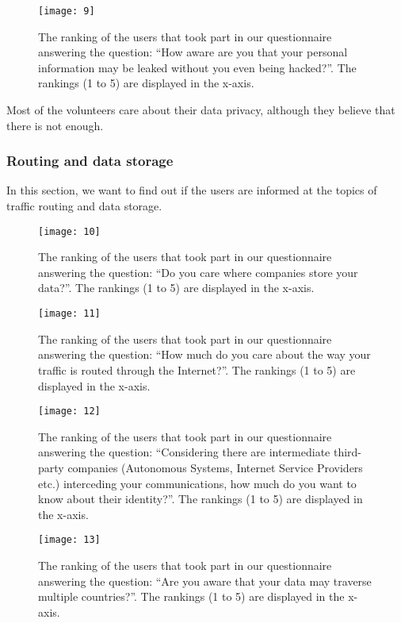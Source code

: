 \begin{figure}[H]
\centering
\texttt{[image: 9]}
\caption{The ranking of the users that took part in our questionnaire answering
the question: ``How aware are you that your personal information may be leaked 
without you even being hacked?''. The rankings (1 to 5) are displayed in the 
x-axis.}
\end{figure}

Most of the volunteers care about their data privacy, although they believe that 
there is not enough.

\subsubsection{Routing and data storage}

In this section, we want to find out if the users are informed at the topics of 
traffic routing and  data storage.

\begin{figure}[H]
\centering
\texttt{[image: 10]}
\caption{The ranking of the users that took part in our questionnaire answering
the question: ``Do you care where companies store your data?''. The rankings (1 
to 5) are displayed in the x-axis.}
\end{figure}

\begin{figure}[H]
\centering
\texttt{[image: 11]}
\caption{The ranking of the users that took part in our questionnaire answering
the question: ``How much do you care about the way your traffic is routed 
through the Internet?''. The rankings (1 to 5) are displayed in the x-axis.}
\end{figure}

\begin{figure}[H]
\centering
\texttt{[image: 12]}
\caption{The ranking of the users that took part in our questionnaire answering
the question: ``Considering there are intermediate third-party companies 
(Autonomous Systems, Internet Service Providers etc.) interceding your 
communications, how much do you want to know about their identity?''. The 
rankings (1 to 5) are displayed in the x-axis.}
\end{figure}

\begin{figure}[H]
\centering
\texttt{[image: 13]}
\caption{The ranking of the users that took part in our questionnaire answering
the question: ``Are you aware that your data may traverse multiple countries?''. The
rankings (1 to 5) are displayed in the x-axis.}
\end{figure}

